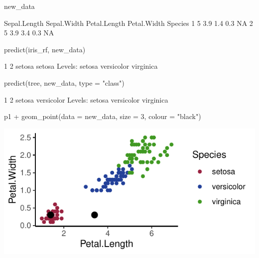 \documentclass[a4paper]{article}
\begin{document}
\begin{Schunk}
\begin{Sinput}
new_data
\end{Sinput}
\begin{Soutput}
  Sepal.Length Sepal.Width Petal.Length Petal.Width Species
1            5         3.9          1.4         0.3      NA
2            5         3.9          3.4         0.3      NA
\end{Soutput}
\begin{Sinput}
predict(iris_rf, new_data)
\end{Sinput}
\begin{Soutput}
     1      2 
setosa setosa 
Levels: setosa versicolor virginica
\end{Soutput}
\begin{Sinput}
predict(tree, new_data, type = "class")
\end{Sinput}
\begin{Soutput}
         1          2 
    setosa versicolor 
Levels: setosa versicolor virginica
\end{Soutput}
\begin{Sinput}
p1 + geom_point(data = new_data, size = 3, colour = "black")
\end{Sinput}


{\centering \includegraphics[width=\maxwidth]{figure/listings-unnamed-chunk-448-1} 

}

\end{Schunk}
\end{document}
